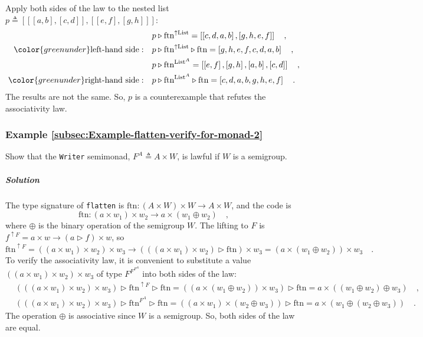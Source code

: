 Apply both sides of the law to the nested list $p\triangleq\left[\left[\left[a,b\right],\left[c,d\right]\right],\left[\left[e,f\right],\left[g,h\right]\right]\right]$:
\begin{align*}
 & p\triangleright\text{ftn}^{\uparrow\text{List}}=\left[\left[c,d,a,b\right],\left[g,h,e,f\right]\right]\quad,\\
{\color{greenunder}\text{left-hand side}:}\quad & p\triangleright\text{ftn}^{\uparrow\text{List}}\triangleright\text{ftn}=\left[g,h,e,f,c,d,a,b\right]\quad,\\
 & p\triangleright\text{ftn}^{\text{List}^{A}}=\left[\left[e,f\right],\left[g,h\right],\left[a,b\right],\left[c,d\right]\right]\quad,\\
{\color{greenunder}\text{right-hand side}:}\quad & p\triangleright\text{ftn}^{\text{List}^{A}}\triangleright\text{ftn}=\left[c,d,a,b,g,h,e,f\right]\quad.
\end{align*}
The results are not the same. So, $p$ is a counterexample that refutes
the associativity law.

\subsubsection{Example \label{subsec:Example-flatten-verify-for-monad-2}\ref{subsec:Example-flatten-verify-for-monad-2}}

Show that the \lstinline!Writer! semimonad, $F^{A}\triangleq A\times W$,
is lawful if $W$ is a semigroup.

\subparagraph{Solution}

The type signature of \lstinline!flatten! is $\text{ftn}:\left(A\times W\right)\times W\rightarrow A\times W$,
and the code is
\[
\text{ftn}:\left(a\times w_{1}\right)\times w_{2}\rightarrow a\times\left(w_{1}\oplus w_{2}\right)\quad,
\]
where $\oplus$ is the binary operation of the semigroup $W$. The
lifting to $F$ is $f^{\uparrow F}=a\times w\rightarrow\left(a\triangleright f\right)\times w$,
so
\[
\text{ftn}^{\uparrow F}=\left(\left(a\times w_{1}\right)\times w_{2}\right)\times w_{3}\rightarrow\left(\left(\left(a\times w_{1}\right)\times w_{2}\right)\triangleright\text{ftn}\right)\times w_{3}=\left(a\times\left(w_{1}\oplus w_{2}\right)\right)\times w_{3}\quad.
\]
To verify the associativity law, it is convenient to substitute a
value $\left(\left(a\times w_{1}\right)\times w_{2}\right)\times w_{3}$
of type $F^{F^{F^{A}}}$ into both sides of the law:
\begin{align*}
 & \left(\left(\left(a\times w_{1}\right)\times w_{2}\right)\times w_{3}\right)\triangleright\text{ftn}^{\uparrow F}\triangleright\text{ftn}=\left(\left(a\times\left(w_{1}\oplus w_{2}\right)\right)\times w_{3}\right)\triangleright\text{ftn}=a\times\left(\left(w_{1}\oplus w_{2}\right)\oplus w_{3}\right)\quad,\\
 & \left(\left(\left(a\times w_{1}\right)\times w_{2}\right)\times w_{3}\right)\triangleright\text{ftn}^{F^{A}}\triangleright\text{ftn}=\left(\left(a\times w_{1}\right)\times\left(w_{2}\oplus w_{3}\right)\right)\triangleright\text{ftn}=a\times\left(w_{1}\oplus\left(w_{2}\oplus w_{3}\right)\right)\quad.
\end{align*}
The operation $\oplus$ is associative since $W$ is a semigroup.
So, both sides of the law are equal.

